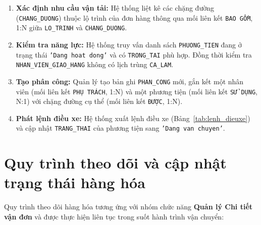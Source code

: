 \documentclass[11pt]{report}
\begin{document}
\begin{enumerate}
    \item \textbf{Xác định nhu cầu vận tải:} Hệ thống liệt kê các chặng đường (\texttt{CHANG\_DUONG}) thuộc lộ trình của đơn hàng thông qua mối liên kết \texttt{BAO GỒM}, 1:N giữa \texttt{LO\_TRINH} và \texttt{CHANG\_DUONG}.
    
    \item \textbf{Kiểm tra năng lực:} Hệ thống truy vấn danh sách \texttt{PHUONG\_TIEN} đang ở trạng thái \texttt{'Dang hoat dong'} và có \texttt{TRONG\_TAI} phù hợp. Đồng thời kiểm tra \texttt{NHAN\_VIEN\_GIAO\_HANG} không có lịch trùng \texttt{CA\_LAM}.
    
    \item \textbf{Tạo phân công:} Quản lý tạo bản ghi \texttt{PHAN\_CONG} mới, gắn kết một nhân viên (mối liên kết \texttt{PHỤ TRÁCH}, 1:N) và một phương tiện (mối liên kết \texttt{SỬ DỤNG}, N:1) với chặng đường cụ thể (mối liên kết \texttt{ĐƯỢC}, 1:N).
    
    \item \textbf{Phát lệnh điều xe:} Hệ thống xuất lệnh điều xe (Bảng~\ref{tab:lenh_dieuxe}) và cập nhật \texttt{TRANG\_THAI} của phương tiện sang \texttt{'Dang van chuyen'}.
\end{enumerate}


\section{Quy trình theo dõi và cập nhật trạng thái hàng hóa}
\label{sec:qt_theodoi}

Quy trình theo dõi hàng hóa tương ứng với nhóm chức năng \textbf{Quản lý Chi tiết vận đơn} và được thực hiện liên tục trong suốt hành trình vận chuyển:
\end{document}
